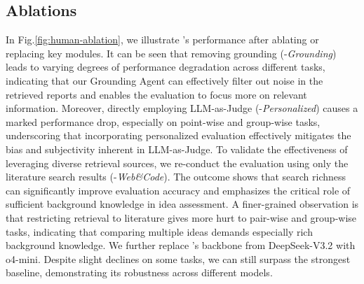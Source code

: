 \vskip -0.2cm
\subsection{Ablations}
\label{sec:ablations}
In Fig.\ref{fig:human-ablation}, we illustrate {\ours}'s performance after ablating or replacing key modules.
It can be seen that removing grounding (-\textit{Grounding}) leads to varying degrees of performance degradation across different tasks, indicating that our Grounding Agent can effectively filter out noise in the retrieved reports and enables the evaluation to focus more on relevant information.
Moreover, directly employing LLM-as-Judge (-\textit{Personalized}) causes a marked performance drop, especially on point-wise and group-wise tasks, underscoring that incorporating personalized evaluation effectively mitigates the bias and subjectivity inherent in LLM-as-Judge.
To validate the effectiveness of leveraging diverse retrieval sources, we re-conduct the evaluation using only the literature search results (-\textit{Web\&Code}).
The outcome shows that search richness can significantly improve evaluation accuracy and emphasizes the critical role of sufficient background knowledge in idea assessment.
A finer-grained observation is that restricting retrieval to literature gives more hurt to pair-wise and group-wise tasks, indicating that comparing multiple ideas demands especially rich background knowledge.
We further replace {\ours}'s backbone from DeepSeek-V3.2 with o4-mini.
Despite slight declines on some tasks, we can still surpass the strongest baseline, demonstrating its robustness across different models.

\vskip -0.2cm
